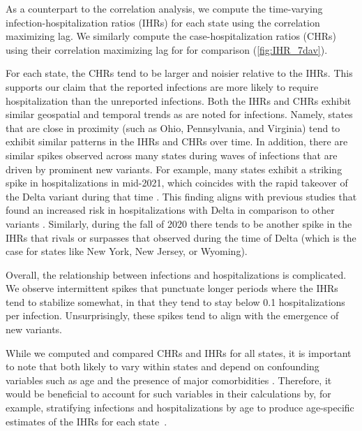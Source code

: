 \documentclass{article}
\begin{document}
As a counterpart to the correlation analysis, we compute the time-varying
infection-hospitalization ratios (IHRs) for each state using the correlation
maximizing lag. We similarly compute the
case-hospitalization ratios (CHRs) using their correlation maximizing lag for
for comparison (\autoref{fig:IHR_7dav}). 

For each state, the CHRs tend to be larger and noisier relative to the
IHRs. This supports our claim that the reported infections are more
likely to require hospitalization than the unreported infections. Both the IHRs
and CHRs exhibit similar geospatial and temporal trends as are noted for
infections. Namely, states that are close in proximity (such as Ohio,
Pennsylvania, and Virginia) tend to exhibit similar patterns in the IHRs and
CHRs over time. In addition, there are similar spikes observed across many
states during waves of infections that are driven by prominent new variants. For
example, many states exhibit a striking spike in hospitalizations in mid-2021,
which coincides with the rapid takeover of the Delta variant during that time
\citep{hodcroft2021covariants}. This finding aligns with previous studies that
found an increased risk in hospitalizations with Delta in comparison to other
variants \citep{twohig2022hospital, nyberg2022comparative}. Similarly, during
the fall of 2020 there tends to be another spike in the IHRs that rivals or
surpasses that observed during the time of Delta (which is the case for states
like New York, New Jersey, or Wyoming). 

Overall, the relationship between infections and hospitalizations is complicated.
We observe intermittent spikes that punctuate longer periods where the IHRs tend to stabilize somewhat, 
in that they tend to stay below 0.1 hospitalizations per infection. 
Unsurprisingly, these spikes tend to align with the emergence of
new variants. 

While we computed and compared CHRs and IHRs for all states, it is important to
note that both likely to vary within states and depend on confounding variables
such as age and the presence of major comorbidities
\citep{russell2023comorbidities}. Therefore, it would be beneficial to account
for such variables in their calculations by, for example, stratifying infections
and hospitalizations by age to produce age-specific estimates of the IHRs for
each state~\citep{fox2023disproportionate}.
\end{document}
